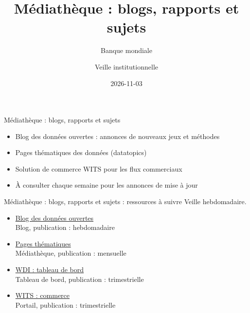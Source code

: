 \documentclass[aspectratio=169,11pt]{beamer}
\title{Médiathèque : blogs, rapports et sujets}
\subtitle{Banque mondiale}
\author{Veille institutionnelle}
\date{2026-11-03}
\begin{document}
\begin{frame}\titlepage\end{frame}

\begin{frame}{Médiathèque : blogs, rapports et sujets}
\begin{itemize}
\item Blog des données ouvertes : annonces de nouveaux jeux et méthodes
\item Pages thématiques des données (datatopics)
\item Solution de commerce WITS pour les flux commerciaux
\item À consulter chaque semaine pour les annonces de mise à jour
\end{itemize}
\end{frame}

\begin{frame}{Médiathèque : blogs, rapports et sujets : ressources à suivre}
\small
Veille hebdomadaire.
\begin{itemize}
\item \href{https://blogs.worldbank.org/en/opendata}{Blog des données ouvertes}\\{\footnotesize Blog, publication : hebdomadaire}
\item \href{https://datatopics.worldbank.org}{Pages thématiques}\\{\footnotesize Médiathèque, publication : mensuelle}
\item \href{https://datatopics.worldbank.org/world-development-indicators/}{WDI : tableau de bord}\\{\footnotesize Tableau de bord, publication : trimestrielle}
\item \href{https://wits.worldbank.org}{WITS : commerce}\\{\footnotesize Portail, publication : trimestrielle}
\end{itemize}
\end{frame}
\end{document}
